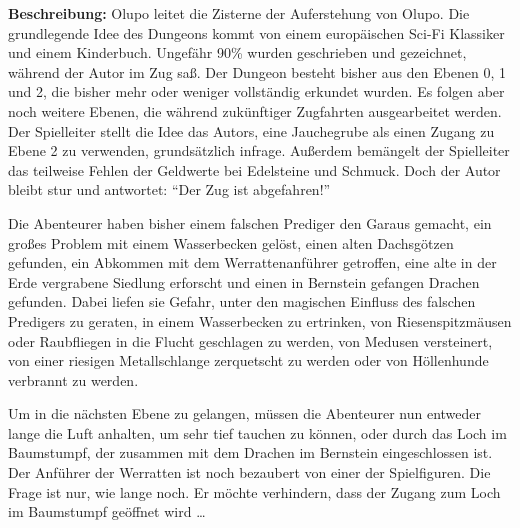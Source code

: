 \documentclass[11pt]{wbzine}
\begin{document}
\begin{multicols}{2}
\textbf{Beschreibung:} Olupo leitet die Zisterne der Auferstehung von
Olupo. Die grundlegende Idee des Dungeons kommt von einem europäischen
Sci-Fi Klassiker und einem Kinderbuch. Ungefähr 90\% wurden geschrieben
und gezeichnet, während der Autor im Zug saß. Der Dungeon besteht bisher
aus den Ebenen 0, 1 und 2, die bisher mehr oder weniger vollständig
erkundet wurden. Es folgen aber noch weitere Ebenen, die während 
zukünftiger Zugfahrten ausgearbeitet werden. Der Spielleiter stellt
die Idee das Autors, eine Jauchegrube als einen Zugang zu Ebene 2 zu
verwenden, grundsätzlich infrage. Außerdem bemängelt der Spielleiter
das teilweise Fehlen der Geldwerte bei Edelsteine und Schmuck. Doch der
Autor bleibt stur und antwortet: ``Der Zug ist abgefahren!''

Die Abenteurer haben bisher einem falschen Prediger den Garaus gemacht,
ein großes Problem mit einem Wasserbecken gelöst, einen alten
Dachsgötzen gefunden, ein Abkommen mit dem Werrattenanführer getroffen,
eine alte in der Erde vergrabene Siedlung erforscht und einen in Bernstein
gefangen Drachen gefunden. Dabei liefen sie Gefahr, unter den magischen
Einfluss des falschen Predigers zu geraten, in einem Wasserbecken
zu ertrinken, von Riesenspitzmäusen oder Raubfliegen in die Flucht
geschlagen zu werden, von Medusen versteinert, von einer riesigen
Metallschlange zerquetscht zu werden oder von Höllenhunde verbrannt
zu werden.

Um in die nächsten Ebene zu gelangen, müssen die Abenteurer nun
entweder lange die Luft anhalten, um sehr tief tauchen zu können, oder
durch das Loch im Baumstumpf, der zusammen mit dem Drachen im Bernstein
eingeschlossen ist. Der Anführer der Werratten ist noch bezaubert von
einer der Spielfiguren. Die Frage ist nur, wie lange noch. Er möchte
verhindern, dass der Zugang zum Loch im Baumstumpf geöffnet
wird \dots{}



\end{multicols}


\end{document}
